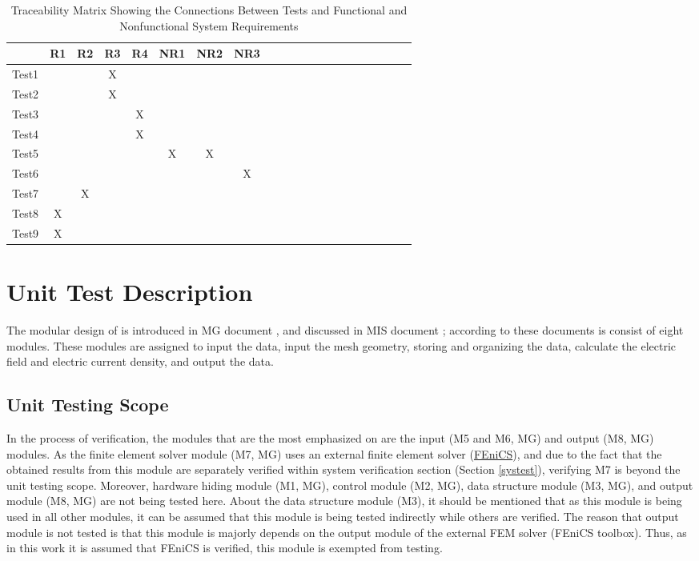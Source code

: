 \documentclass[12pt, titlepage]{article}
\begin{document}
\begin{table}[h!]
	\centering
	\begin{tabular}{|c|c|c|c|c|c|c|c|c|c|c|c|c|c|c|c|c|c|c|c|c|}
		\hline        
		& R1 & R2 & R3 & R4 & NR1 & NR2 & NR3 \\
		\hline
		Test1        & & &X& & & &   \\ \hline
		Test2        & & &X& & & &   \\ \hline
		Test3        & & & &X& & &   \\ \hline
		Test4        & & & &X& & & \\ \hline
		Test5        & & & & &X&X&   \\ \hline
		Test6        & & & & & & &X \\ \hline
		Test7        & &X& & & & &   \\ \hline
		Test8        &X& & & & & &   \\ \hline
		Test9        &X& & & & & &  \\ \hline
		\end{tabular}
\caption{Traceability Matrix Showing the Connections Between Tests and Functional and Nonfunctional System Requirements}
\label{Table:A_trace}
\end{table}

\section{Unit Test Description} \label{utest}

The modular design of \progname{} is introduced in MG document \citep{MGSPDFMdoc74:online}, and discussed in MIS document \citep{MISSPDFMdoc81:online}; according to these documents \progname{} is consist of eight modules. These modules are assigned to input the data, input the mesh geometry, storing and organizing the data, calculate the electric field and electric current density, and output the data. 

\subsection{Unit Testing Scope}


In the process of \progname{} verification, the modules that are the most emphasized on are the input (M5 and M6, MG) and output (M8, MG) modules. As the finite element solver module (M7, MG) uses an external finite element solver (\href{www.fenics.org}{FEniCS}), and due to the fact that the obtained results from this module are separately verified within system verification section (Section \ref{systest}), verifying M7 is beyond the unit testing scope. Moreover, hardware hiding module (M1, MG), \progname{} control module (M2, MG), data structure module (M3, MG), and output module (M8, MG) are not being tested here. About the data structure module (M3), it should be mentioned that as this module is being used in all other modules, it can be assumed that this module is being tested indirectly while others are verified. The reason that output module is not tested is that this module is majorly depends on the output module of the external FEM solver (FEniCS toolbox). Thus, as in this work it is assumed that FEniCS is verified, this module is exempted from testing.  
\end{document}
